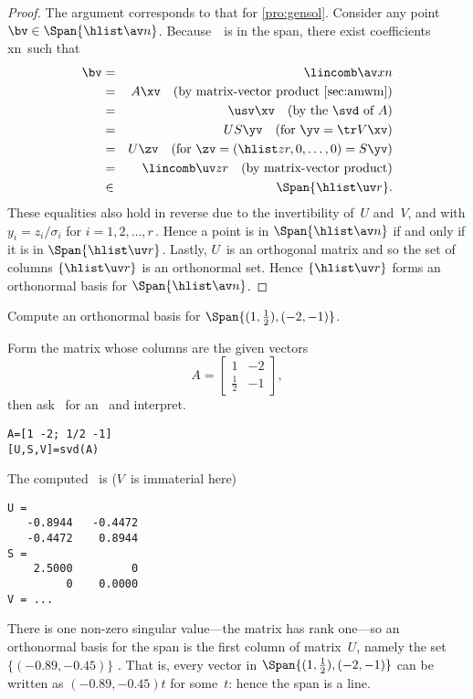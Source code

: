 \begin{proof} 
The argument corresponds to that for \autoref{pro:gensol}.
Consider any point \(\bv\in\Span\{\hlist\av n\}\).
Because~\bv\ is in the span, there exist coefficients \hlist xn\ such that
\begin{eqnarray*}
\bv&=&\lincomb \av xn
\\&=&A\xv \quad(\text{by matrix-vector product \autoref{sec:amwm}})
\\&=&\usv \xv \quad(\text{by the \svd\ of }A)
\\&=&US \yv \quad(\text{for }\yv=\tr V\xv)
\\&=&U\zv \quad(\text{for }\zv=(\hlist zr,0,\ldots,0)=S\yv)
\\&=&\lincomb \uv z r  \quad(\text{by matrix-vector product})
\\&\in&\Span\{\hlist \uv r\}.
\end{eqnarray*}
These equalities also hold in reverse due to the invertibility of~\(U\) and~\(V\), and with \(y_i=z_i/\sigma_i\) for \(i=1,2,\ldots,r\)\,.
Hence a point is in \(\Span\{\hlist\av n\}\) if and only if it is in \(\Span\{\hlist \uv r\}\).
Lastly, \(U\)~is an orthogonal matrix and so the set of columns \(\{\hlist \uv r\}\) is an orthonormal set.
Hence \(\{\hlist \uv r\}\) forms an orthonormal basis for \(\Span\{\hlist\av n\}\).
\end{proof}


\begin{example} \label{eg:orthspn2}
Compute an orthonormal basis for \(\Span\{(1,\frac12),(-2,-1)\}\).
\begin{solution} 
Form the matrix whose columns are the given vectors
\begin{equation*}
A=\begin{bmatrix} 1&-2\\\frac12&-1 \end{bmatrix},
\end{equation*}
then ask \script\ for an \svd\ and interpret.
\begin{verbatim}
A=[1 -2; 1/2 -1]
[U,S,V]=svd(A)
\end{verbatim}
\setbox\ajrqrbox\hbox{}%
\marginpar{\usebox{\ajrqrbox}}%
The computed \svd\ is (\(V\)~is immaterial here)
\begin{verbatim}
U =
   -0.8944   -0.4472
   -0.4472    0.8944
S =
    2.5000         0
         0    0.0000
V = ...
\end{verbatim}
There is one non-zero singular value---the matrix has rank one---so an orthonormal basis for the span is the first column of matrix~\(U\), namely the set \(\{(-0.89,-0.45)\}\) \twodp.
That is, every vector in \(\Span\{(1,\frac12),(-2,-1)\}\) can be written as \((-0.89,-0.45)t\) for some~\(t\): hence the span is a line.
\end{solution}
\end{example}


